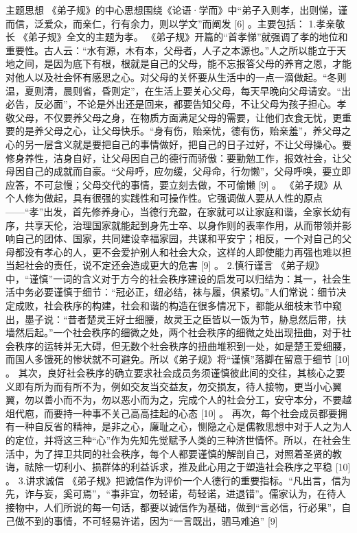 \documentclass[a4paper,12pt,UTF8,twoside]{ctexbook}
\begin{document}
主题思想
《弟子规》的中心思想围绕《论语·学而》中“弟子入则孝，出则悌，谨而信，泛爱众，而亲仁，行有余力，则以学文”而阐发 [6]
。主要包括：
1.孝亲敬长
《弟子规》全文的主题为孝。
《弟子规》开篇的“首孝悌”就强调了孝的地位和重要性。古人云：“水有源，木有本，父母者，人子之本源也。”人之所以能立于天地之间，是因为底下有根，根就是自己的父母，能不忘报答父母的养育之恩，才能对他人以及社会怀有感恩之心。对父母的关怀要从生活中的一点一滴做起。“冬则温，夏则清，晨则省，昏则定”，在生活上要关心父母，每天早晚向父母请安。“出必告，反必面”，不论是外出还是回来，都要告知父母，不让父母为孩子担心。孝敬父母，不仅要养父母之身，在物质方面满足父母的需要，让他们衣食无忧，更重要的是养父母之心，让父母快乐。“身有伤，贻亲忧，德有伤，贻亲羞”，养父母之心的另一层含义就是要把自己的事情做好，把自己的日子过好，不让父母操心。要修身养性，洁身自好，让父母因自己的德行而骄傲：要勤勉工作，报效社会，让父母因自己的成就而自豪。“父母呼，应勿缓，父母命，行勿懒”，父母呼唤，要立即应答，不可怠慢；父母交代的事情，要立刻去做，不可偷懒 [9]
。
《弟子规》从个人修为做起，具有很强的实践性和可操作性。它强调做人要从人性的原点——“孝”出发，首先修养身心，当德行充盈，在家就可以让家庭和谐，全家长幼有序，共享天伦，治理国家就能起到身先士卒、以身作则的表率作用，从而带领并影响自己的团体、国家，共同建设幸福家园，共谋和平安宁；相反，一个对自己的父母都没有孝心的人，更不会爱护别人和社会大众，这样的人即使能力再强也难以担当起社会的责任，说不定还会造成更大的危害 [9]
。
2.慎行谨言
《弟子规》中，“谨慎”一词的含义对于方今的社会秩序建设的启发可以归结为：其一，社会生活中务必要谨慎于细节：“冠必正，纽必结，袜与履，俱紧切。”人们常说：细节决定成败，社会秩序的构建，社会和谐的构造在很多情况下，都能从细枝末节中窥出，墨子说：“昔者楚灵王好士细腰，故灵王之臣皆以一饭为节，胁息然后带，扶墙然后起。”一个社会秩序的细微之处，两个社会秩序的细微之处出现扭曲，对于社会秩序的运转并无大碍，但无数个社会秩序的扭曲堆积到一处，如是楚王爱细腰，而国人多饿死的惨状就不可避免。所以《弟子规》将“谨慎”落脚在留意于细节 [10]
。
其次，良好社会秩序的确立要求社会成员务须谨慎彼此间的交往，其核心之要义即有所为而有所不为，例如交友当交益友，勿交损友，待人接物，更当小心翼翼，勿以善小而不为，勿以恶小而为之，完成个人的社会分工，安守本分，不要越俎代庖，而要持一种事不关己高高挂起的心态 [10]
。
再次，每个社会成员都要拥有一种自反省的精神，是非之心，廉耻之心，恻隐之心是儒教思想中对于人之为人的定位，并将这三种“心”作为先知先觉赋予人类的三种济世情怀。所以，在社会生活中，为了捍卫共同的社会秩序，每个人都要谨慎的解剖自己，对照着圣贤的教诲，祛除一切利小、损群体的利益诉求，推及此心用之于塑造社会秩序之平稳 [10]
。
3.讲求诚信
《弟子规》把诚信作为评价一个人德行的重要指标。“凡出言，信为先，诈与妄，奚可焉”，“事非宜，勿轻诺，苟轻诺，进退错”。儒家认为，在待人接物中，人们所说的每一句话，都要以诚信作为基础，做到“言必信，行必果”，自己做不到的事情，不可轻易许诺，因为“一言既出，驷马难追” [9]
\end{document}
